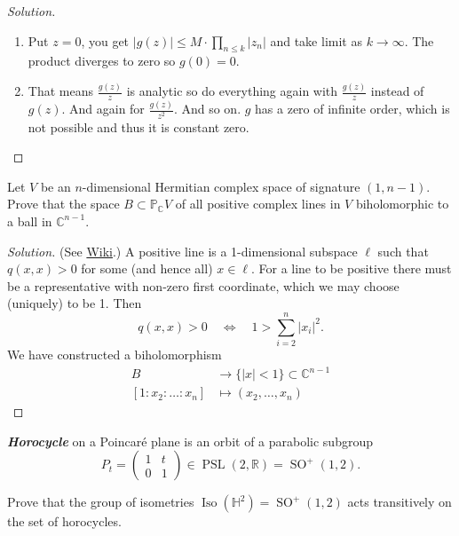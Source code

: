 \begin{proof}[Solution]
\begin{enumerate}[label=\textbf{Step \arabic*}]
		\item Put $z=0$, you get $|g(z)| \leq M\cdot \prod_{n\leq k} |z_{n}| $ and take limit as $k\to \infty$. The product diverges to zero so $g(0)=0$.

		\item That means $\frac{g(z)}{z}$ is analytic so do everything again with $\frac{g(z)}{z}$ instead of $g(z)$. And again for $\frac{g(z)}{z^{2}}$. And so on. $g$ has a zero of infinite order, which is not possible and thus it is constant zero.
	\end{enumerate}
\end{proof}

\begin{manualexercise}{3.3}
	Let $V$ be an $n$-dimensional Hermitian complex space of signature $(1,n-1)$. Prove that the space $B\subset \mathbb{P}_{\mathbb{C}}V$ of all positive complex lines in $V$ biholomorphic to a ball in $\mathbb{C}^{n-1}$.
\end{manualexercise}

\begin{proof}[Solution]
	(See \href{https://en.wikipedia.org/wiki/Complex_hyperbolic_space#Projective_model}{Wiki}.) A positive line is a 1-dimensional subspace $\ell$ such that $q(x,x)>0$ for some (and hence all) $x\in \ell$. For a line to be positive there must be a representative with non-zero first coordinate, which we may choose (uniquely) to be 1. Then
	\[q(x,x) >0\quad \iff\quad 1>\sum_{i=2}^{n} |x_i|^2.\]
We have constructed a biholomorphism
\begin{align*}
	B &\longrightarrow \{ |x|<1\} \subset \mathbb{C}^{n-1} \\
	[1:x_2:\ldots:x_n] &\longmapsto (x_2,\ldots,x_n)
\end{align*}

\end{proof}

\begin{manualdef}{3.1}
	\textit{\textbf{Horocycle}} on a Poincar\'e plane is an orbit of a parabolic subgroup
	\[P_{t}=\begin{pmatrix}1&t\\0&1\end{pmatrix}\in \operatorname{PSL}(2,\mathbb{R})=\operatorname{SO}^{+}(1,2). \]
\end{manualdef}

\begin{manualexercise}{3.7}
	Prove that the group of isometries $\operatorname{Iso}(\mathbb{H}^{2})=\operatorname{SO}^{+}(1,2)$ acts transitively on the set of horocycles.
\end{manualexercise}


